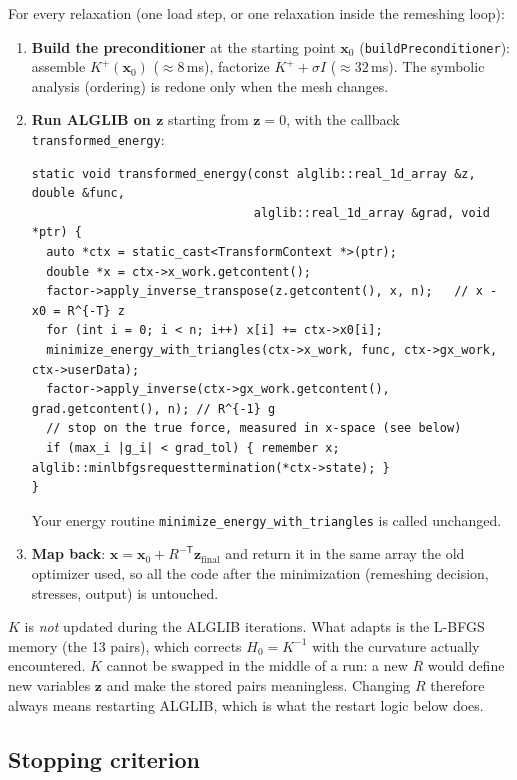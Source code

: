 \documentclass[11pt,a4paper]{article}
\theoremstyle{remark}
\newcommand{\x}{\bm{x}}
\newcommand{\z}{\bm{z}}
\newcommand{\mT}{^{-\mathsf T}}
\newcommand{\code}[1]{\texttt{#1}}
\begin{document}
For every relaxation (one load step, or one relaxation inside the remeshing loop):
\begin{enumerate}[leftmargin=*]
\item \textbf{Build the preconditioner} at the starting point $\x_0$ (\code{buildPreconditioner}):
assemble $K^+(\x_0)$ ($\approx8$\,ms), factorize $K^++\sigma I$ ($\approx32$\,ms). The
symbolic analysis (ordering) is redone only when the mesh changes.
\item \textbf{Run ALGLIB on $\z$} starting from $\z=0$, with the callback
\code{transformed\_\allowbreak{}energy}:
\begin{lstlisting}
static void transformed_energy(const alglib::real_1d_array &z, double &func,
                               alglib::real_1d_array &grad, void *ptr) {
  auto *ctx = static_cast<TransformContext *>(ptr);
  double *x = ctx->x_work.getcontent();
  factor->apply_inverse_transpose(z.getcontent(), x, n);   // x - x0 = R^{-T} z
  for (int i = 0; i < n; i++) x[i] += ctx->x0[i];
  minimize_energy_with_triangles(ctx->x_work, func, ctx->gx_work, ctx->userData);
  factor->apply_inverse(ctx->gx_work.getcontent(), grad.getcontent(), n); // R^{-1} g
  // stop on the true force, measured in x-space (see below)
  if (max_i |g_i| < grad_tol) { remember x; alglib::minlbfgsrequesttermination(*ctx->state); }
}
\end{lstlisting}
Your energy routine \code{minimize\_\allowbreak{}energy\_\allowbreak{}with\_\allowbreak{}triangles} is called unchanged.
\item \textbf{Map back}: $\x = \x_0 + R\mT\z_{\text{final}}$ and return it in the same array the
old optimizer used, so all the code after the minimization (remeshing decision, stresses,
output) is untouched.
\end{enumerate}
$K$ is \emph{not} updated during the ALGLIB iterations. What adapts is the L-BFGS memory
(the 13 pairs), which corrects $H_0=K^{-1}$ with the curvature actually encountered. $K$ cannot
be swapped in the middle of a run: a new $R$ would define new variables $\z$ and make the stored
pairs meaningless. Changing $R$ therefore always means restarting ALGLIB, which is what the
restart logic below does.

\subsection{Stopping criterion}
\label{sec:stop}
\end{document}
